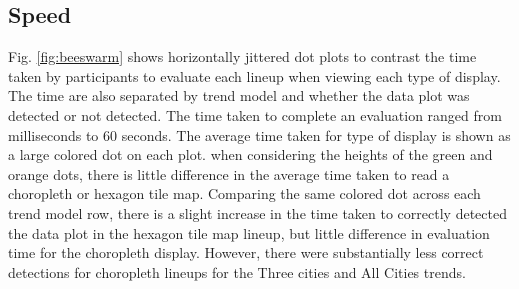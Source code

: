 \documentclass[12pt]{article}
\begin{document}
\subsection{Speed}
\label{sec:sp}

Fig. \ref{fig:beeswarm} shows horizontally jittered dot plots to
contrast the time taken by participants to evaluate each lineup when
viewing each type of display. The time are also separated by trend model
and whether the data plot was detected or not detected. The time taken
to complete an evaluation ranged from milliseconds to 60 seconds. The
average time taken for type of display is shown as a large colored dot
on each plot. when considering the heights of the green and orange dots,
there is little difference in the average time taken to read a
choropleth or hexagon tile map. Comparing the same colored dot across
each trend model row, there is a slight increase in the time taken to
correctly detected the data plot in the hexagon tile map lineup, but
little difference in evaluation time for the choropleth display.
However, there were substantially less correct detections for choropleth
lineups for the Three cities and All Cities trends.
\end{document}

